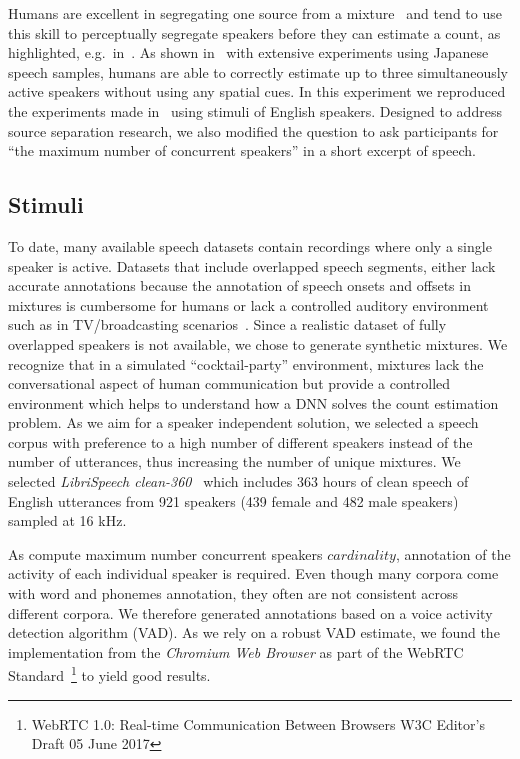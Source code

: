 Humans are excellent in segregating one source from a mixture~\cite{bregman} and tend to use this skill to perceptually segregate speakers before they can estimate a count, as highlighted, e.g.\ in~\cite{kawashima15}.
As shown in~\cite{kashino96, kawashima15} with extensive experiments using Japanese speech samples, humans are able to correctly estimate up to three simultaneously active speakers without using any spatial cues.
In this experiment we reproduced the experiments made in~\cite{kawashima15, kashino96} using stimuli of English speakers.
Designed to address source separation research, we also modified the question to ask participants for ``the maximum number of concurrent speakers'' in a short excerpt of speech.

\subsection{Stimuli}
To date, many available speech datasets contain recordings where only a single speaker is active.
Datasets that include overlapped speech segments, either lack accurate annotations because the annotation of speech onsets and offsets in mixtures is cumbersome for humans or lack a controlled auditory environment such as in TV/broadcasting scenarios~\cite{Gravier12}.
Since a realistic dataset of fully overlapped speakers is not available, we chose to generate synthetic mixtures.
We recognize that in a simulated ``cocktail-party'' environment, mixtures lack the conversational aspect of human communication but provide a controlled environment which helps to understand how a DNN solves the count estimation problem.
As we aim for a speaker independent solution, we selected a speech corpus with preference to a high number of different speakers instead of the number of utterances, thus increasing the number of unique mixtures.
We selected \emph{LibriSpeech clean-360}~\cite{panayotov15} which includes 363 hours of clean speech of English utterances from 921 speakers (439 female and 482 male speakers) sampled at 16 kHz.
\par
As compute maximum number concurrent speakers \(cardinality\), annotation of the activity of each individual speaker is required.
Even though many corpora come with word and phonemes annotation, they often are not consistent across different corpora.
We therefore generated annotations based on a voice activity detection algorithm (VAD). As we rely on a robust VAD estimate, we found the implementation from the \emph{Chromium Web Browser} as part of the WebRTC Standard~\footnote{WebRTC 1.0: Real-time Communication Between Browsers W3C Editor's Draft 05 June 2017} to yield good results.
